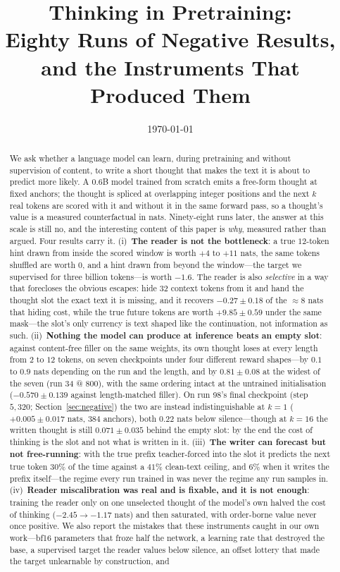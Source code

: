 \documentclass{article} %
\title{Thinking in Pretraining:\\ Eighty Runs of Negative Results, and the Instruments That Produced Them}
\author{}
\date{\today}
\begin{document}
\maketitle

\begin{abstract}
We ask whether a language model can learn, during pretraining and without supervision of content, to write a short thought that makes the text it is about to predict more likely. A 0.6B model trained from scratch emits a free-form thought at fixed anchors; the thought is spliced at overlapping integer positions and the next $k$ real tokens are scored with it and without it in the same forward pass, so a thought's value is a measured counterfactual in nats. Ninety-eight runs later, the answer at this scale is still no, and the interesting content of this paper is \emph{why}, measured rather than argued. Four results carry it. (i)~\textbf{The reader is not the bottleneck}: a true $12$-token hint drawn from inside the scored window is worth $+4$ to $+11$ nats, the same tokens shuffled are worth $0$, and a hint drawn from beyond the window---the target we supervised for three billion tokens---is worth $-1.6$. The reader is also \emph{selective} in a way that forecloses the obvious escapes: hide $32$ context tokens from it and hand the thought slot the exact text it is missing, and it recovers $-0.27 \pm 0.18$ of the ${\approx}8$ nats that hiding cost, while the true future tokens are worth $+9.85 \pm 0.59$ under the same mask---the slot's only currency is text shaped like the continuation, not information as such. (ii)~\textbf{Nothing the model can produce at inference beats an empty slot}: against content-free filler on the same weights, its own thought loses at every length from $2$ to $12$ tokens, on seven checkpoints under four different reward shapes---by $0.1$ to $0.9$ nats depending on the run and the length, and by $0.81 \pm 0.08$ at the widest of the seven (run 34 @ $800$), with the same ordering intact at the untrained initialisation ($-0.570 \pm 0.139$ against length-matched filler). On run 98's final checkpoint (step $5{,}320$; Section~\ref{sec:negative}) the two are instead indistinguishable at $k{=}1$ ($+0.005 \pm 0.017$ nats, $384$ anchors), both $0.22$ nats below silence---though at $k{=}16$ the written thought is still $0.071 \pm 0.035$ behind the empty slot: by the end the cost of thinking is the slot and not what is written in it. (iii)~\textbf{The writer can forecast but not free-running}: with the true prefix teacher-forced into the slot it predicts the next true token $30\%$ of the time against a $41\%$ clean-text ceiling, and $6\%$ when it writes the prefix itself---the regime every run trained in was never the regime any run samples in. (iv)~\textbf{Reader miscalibration was real and is fixable, and it is not enough}: training the reader only on one unselected thought of the model's own halved the cost of thinking ($-2.45 \to -1.17$ nats) and then saturated, with order-borne value never once positive. We also report the mistakes that these instruments caught in our own work---bf16 parameters that froze half the network, a learning rate that destroyed the base, a supervised target the reader values below silence, an offset lottery that made the target unlearnable by construction, and 
\end{abstract}
\end{document}
